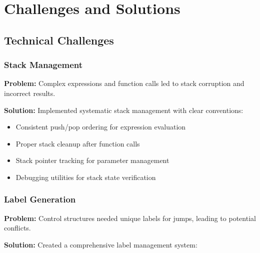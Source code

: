 \documentclass[12pt,a4paper]{article}
\begin{document}
\section{Challenges and Solutions}

\subsection{Technical Challenges}

\subsubsection{Stack Management}

\textbf{Problem:} Complex expressions and function calls led to stack corruption and incorrect results.

\textbf{Solution:} Implemented systematic stack management with clear conventions:
\begin{itemize}
    \item Consistent push/pop ordering for expression evaluation
    \item Proper stack cleanup after function calls
    \item Stack pointer tracking for parameter management
    \item Debugging utilities for stack state verification
\end{itemize}

\subsubsection{Label Generation}

\textbf{Problem:} Control structures needed unique labels for jumps, leading to potential conflicts.

\textbf{Solution:} Created a comprehensive label management system:
\end{document}
